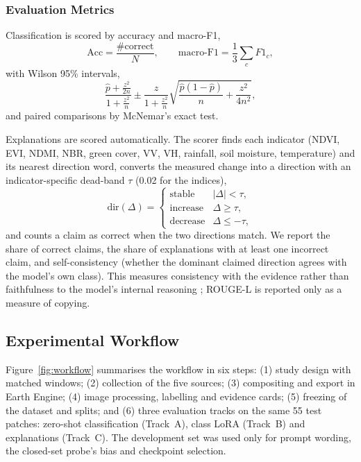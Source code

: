 \documentclass[11pt]{article}
\begin{document}
\subsubsection{Evaluation Metrics}

Classification is scored by accuracy and macro-F1,
\begin{equation}
\mathrm{Acc}=\frac{\#\text{correct}}{N},\qquad
\text{macro-F1}=\frac{1}{3}\sum_{c}F1_c,
\label{eq:metrics}
\end{equation}
with Wilson 95\% intervals,
\begin{equation}
\frac{\hat p+\frac{z^2}{2n}}{1+\frac{z^2}{n}}\pm\frac{z}{1+\frac{z^2}{n}}\sqrt{\frac{\hat p(1-\hat p)}{n}+\frac{z^2}{4n^2}},
\label{eq:wilson}
\end{equation}
and paired comparisons by McNemar's exact test.

Explanations are scored automatically. The scorer finds each indicator
(NDVI, EVI, NDMI, NBR, green cover, VV, VH, rainfall, soil moisture,
temperature) and its nearest direction word, converts the measured change
into a direction with an indicator-specific dead-band $\tau$ (0.02 for
the indices),
\begin{equation}
\mathrm{dir}(\Delta)=
\begin{cases}
\text{stable} & |\Delta|<\tau,\\
\text{increase} & \Delta\ge\tau,\\
\text{decrease} & \Delta\le-\tau,
\end{cases}
\label{eq:deadband}
\end{equation}
and counts a claim as correct when the two directions match. We report
the share of correct claims, the share of explanations with at least one
incorrect claim, and self-consistency (whether the dominant claimed
direction agrees with the model's own class). This measures consistency
with the evidence rather than faithfulness to the model's internal
reasoning \citep{jacovi2020}; ROUGE-L is reported
only as a measure of copying.

\subsection{Experimental Workflow}

Figure~\ref{fig:workflow} summarises the workflow in six steps: (1)
study design with matched windows; (2) collection of the five sources;
(3) compositing and export in Earth Engine; (4) image processing,
labelling and evidence cards; (5) freezing of the dataset and splits; and
(6) three evaluation tracks on the same 55 test patches: zero-shot
classification (Track~A), class LoRA (Track~B) and explanations
(Track~C). The development set was used only for prompt wording, the
closed-set probe's bias and checkpoint selection.
\end{document}

